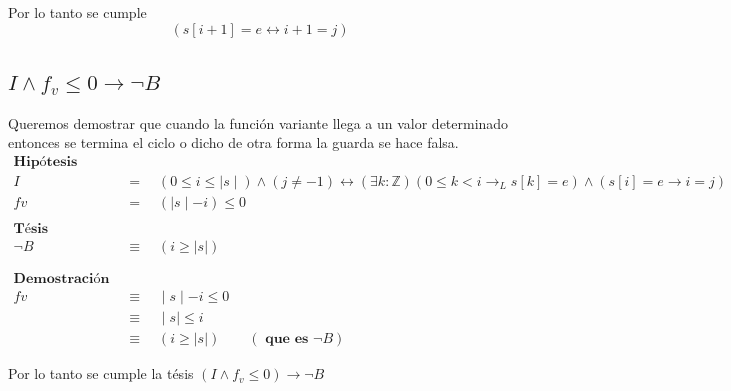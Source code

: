\documentclass[12pt]{book}
\begin{document}
\begin{shaded}
Por lo tanto se cumple  \[ (s[i+1] = e \leftrightarrow i+1 = j) \]
\end{shaded}


\subsection{$ I \land  f_v \leq 0 \rightarrow \neg B$ }

Queremos demostrar que cuando la funci\'on variante llega a un valor determinado entonces se termina el ciclo o dicho de otra forma la guarda se hace falsa.
\begin{align*}
\textbf{Hip\'otesis} \\
I &= \quad (0 \leq i \leq  \mid s \mid) \wedge (j \neq -1) \leftrightarrow (\exists k : \mathbb{Z})(0 \leq k < i \rightarrow_L s[k] = e) \wedge (s[i] = e \rightarrow i = j) \\
fv &= \quad ( \mid s \mid - i )\leq 0  \\ \\
\textbf{T\'esis} \\
\neg B &\equiv \quad  (i \geq |s|) \\ \\ \\
\textbf{Demostraci\'on } \\
fv &\equiv \quad  \mid s \mid - i \leq 0  \\
&\equiv \quad  \mid s \mid \leq i \\
&\equiv \quad  (i \geq |s|) \qquad (\textbf{ que es } \neg B)
\end{align*}

\begin{shaded}
Por lo tanto se cumple la t\'esis $ (I \land  f_v \leq 0) \rightarrow \neg B$
\end{shaded}
\end{document}
